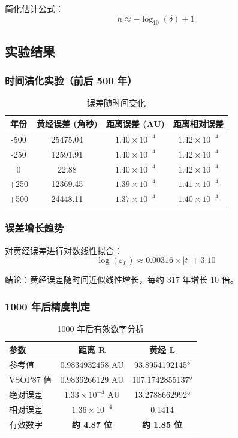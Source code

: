 \documentclass[12pt,a4paper]{article}
\begin{document}
简化估计公式：
\begin{equation}
    n \approx -\log_{10}(\delta) + 1
\end{equation}

\subsection{实验结果}

\subsubsection{时间演化实验（前后 500 年）}

\begin{table}[H]
\centering
\caption{误差随时间变化}
\begin{tabular}{cccc}
\toprule
\textbf{年份} & \textbf{黄经误差 (角秒)} & \textbf{距离误差 (AU)} & \textbf{距离相对误差} \\
\midrule
-500 & 25475.04 & $1.40 \times 10^{-4}$ & $1.42 \times 10^{-4}$ \\
-250 & 12591.91 & $1.40 \times 10^{-4}$ & $1.42 \times 10^{-4}$ \\
0 & 22.88 & $1.40 \times 10^{-4}$ & $1.42 \times 10^{-4}$ \\
+250 & 12369.45 & $1.39 \times 10^{-4}$ & $1.41 \times 10^{-4}$ \\
+500 & 24448.11 & $1.37 \times 10^{-4}$ & $1.40 \times 10^{-4}$ \\
\bottomrule
\end{tabular}
\end{table}

\subsubsection{误差增长趋势}

对黄经误差进行对数线性拟合：
\begin{equation}
    \log(\varepsilon_L) \approx 0.00316 \times |t| + 3.10
\end{equation}

结论：黄经误差随时间近似线性增长，每约 317 年增长 10 倍。

\subsubsection{1000 年后精度判定}

\begin{table}[H]
\centering
\caption{1000 年后有效数字分析}
\begin{tabular}{lcc}
\toprule
\textbf{参数} & \textbf{距离 R} & \textbf{黄经 L} \\
\midrule
参考值 & 0.9834932458 AU & 93.8954192145° \\
VSOP87 值 & 0.9836266129 AU & 107.1742855137° \\
绝对误差 & $1.33 \times 10^{-4}$ AU & 13.2788662992° \\
相对误差 & $1.36 \times 10^{-4}$ & 0.1414 \\
有效数字 & \textbf{约 4.87 位} & \textbf{约 1.85 位} \\
\bottomrule
\end{tabular}
\end{table}
\end{document}
